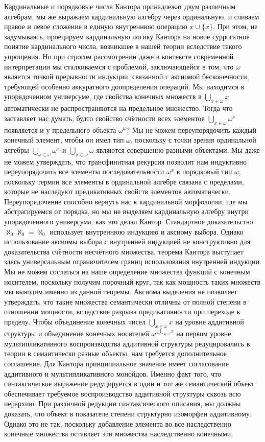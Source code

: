 \documentclass[12pt]{article}
\begin{document}
Кардинальные и порядковые числа Кантора принадлежат двум различным алгебрам, мы же выражаем кардинальную алгебру через ординальную, и сливаем правое и левое сложение в единую внутреннюю операцию $x \cup \{ x \}$. При этом, не задумываясь, проецируем кардинальную логику Кантора на новое суррогатное понятие кардинального числа, возникшее в нашей теории вследствие такого упрощения. Но при строгом рассмотрении даже в контексте современной интерпретации мы сталкиваемся с проблемой, заключающейся в том, что $\omega$ является точкой прерывности индукции, связанной с аксиомой бесконечности, требующей особенно аккуратного доопределения операций. Мы находимся в упорядоченном универсуме, где свойства конечных множеств в $\bigcup\limits_{ x \in \omega } x$ автоматически не распространяются на предельное множество. Тогда что заставляет нас думать, будто свойство счётности всех элементов $\bigcup\limits_{ x \in \omega } \omega^x$ появляется и у предельного объекта $\omega^{\omega}$? Мы не можем переупорядочить каждый конечный элемент, чтобы он имел тип $\omega$, поскольку с точки зрения ординальной алгебры $\bigcup\limits_{ x \in \omega } \omega^x$ и $\bigcup\limits_{ x \in \omega } \omega$ являются совершенно разными объектами. Мы даже не можем утверждать, что трансфинитная рекурсия позволит нам индуктивно переупорядочить все элементы последовательности $\omega^x$ в порядковый тип $\omega$, поскольку термин все элементы в ординальной алгебре связана с пределами, которые не наследуют предикативных свойств элементов автоматически. Переупорядочение способно вернуть нас к кардинальной морфологии, где мы абстрагируемся от порядка, но мы не выделяем кардинальную алгебру внутри упорядоченного универсума, как это делал Кантор. Стандартное доказательство $\aleph_0\aleph_0 = \aleph_0$ использует внутреннюю индукцию и аксиому выбора. Однако использование аксиомы выбора с внутренней индукцией не конструктивно для доказательства счётности несчётного множества, теорема Кантора выступает здесь универсальным ограничителем границ использования внутренней индукции. Мы не можем сослаться на наше определение множества функций с конечным носителем, поскольку получим порочный круг, так как мощность таких множеств мы выводим именно из данной теоремы. Аксиома выделения не позволяет утверждать, что такие множества семантически отличны от полной степени в отношении мощности, вследствие разрыва предикативности при переходе к пределу. Чтобы объединение конечных чисел $\bigcup\limits_{ x \in \omega } x$ на уровне аддитивной структуры и объединение конечных носителей $\omega^{\bigcup\limits_{ x \in \omega } x}$ на первом уровне мультипликативного воспроизводства аддитивной структуры редуцировались в теории в семантически разные объекты, нам требуется дополнительное соглашение. Для Кантора принципиальное значение имеет согласование аддитивного и мультипликативного монойдов. Именно факт того, что синтаксическое выражение редуцируется в один и тот же семантический объект обеспечивает требуемое воспроизводство аддитивной структуры сквозь всю иерархию. При различной редукции синтаксического описания, мы должны доказать, что объект в показателе степени структурно изоморфен аддитивному. Однако это не так, поскольку добавление элемента во все наследственно конечные множества оставляет эти множества наследственно конечными, 
\end{document}
